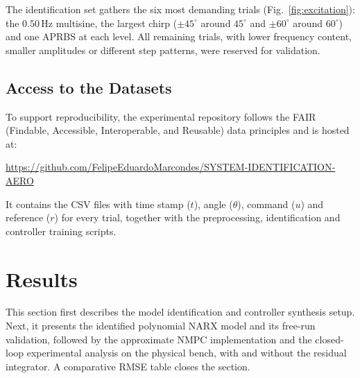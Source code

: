 \documentclass{ifacconf}
\newif\ifinstr \instrfalse
\newcommand{\instr}[1]{%
  \ifinstr
    \par\noindent
    \fcolorbox{orange!80!black}{yellow!20}{%
      \parbox{\dimexpr\linewidth-2\fboxsep-2\fboxrule}{%
        \small\sffamily\color{orange!40!black}%
        \textbf{Instrução:} #1}}%
    \par\medskip
  \fi}
\newcommand{\tamanho}[1]{%
  \ifinstr
    \par\noindent
    \fcolorbox{blue!80!black}{gray!20}{%
      \parbox{\dimexpr\linewidth-2\fboxsep-2\fboxrule}{%
        \small\sffamily\color{black!40!black}%
        \textbf{Tamanho:} #1}}%
    \par\medskip
  \fi}
\begin{document}
\instr{Describe measured output signals (plot them on a graph).}

The identification set gathers the six most demanding trials (Fig.~\ref{fig:excitation}): the $0.50\,\mathrm{Hz}$ multisine, the largest chirp ($\pm 45^\circ$ around $45^\circ$ and $\pm 60^\circ$ around $60^\circ$) and one APRBS at each level. All remaining trials, with lower frequency content, smaller amplitudes or different step patterns, were reserved for validation.

\subsection{Access to the Datasets}

\instr{Create a github repo; check the guidelines of Scientific Data, for example; check the BAB datasets)}

To support reproducibility, the experimental repository follows the FAIR (Findable, Accessible, Interoperable, and Reusable) data principles and is hosted at:
\begin{center}
\url{https://github.com/FelipeEduardoMarcondes/SYSTEM-IDENTIFICATION-AERO}
\end{center}
It contains the CSV files with time stamp ($t$), angle ($\theta$), command ($u$) and reference ($r$) for every trial, together with the preprocessing, identification and controller training scripts.

\section{Results} \label{sec:results}
\tamanho{1.5 pp.}

This section first describes the model identification and controller synthesis setup. Next, it presents the identified polynomial NARX model and its free-run validation, followed by the approximate NMPC implementation and the closed-loop experimental analysis on the physical bench, with and without the residual integrator. A comparative RMSE table closes the section.

\instr{adicionar no paragrafo acima um resumo do que se encontra na secao , um resumo}
\end{document}
